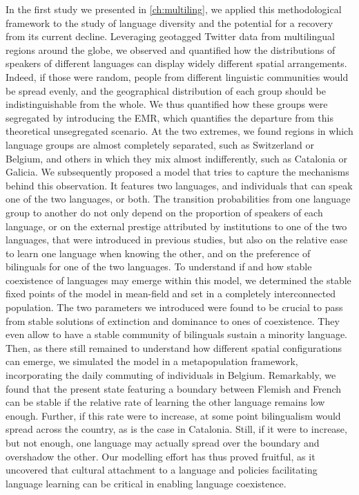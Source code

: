 \documentclass[../thesis.tex]{subfiles}
\begin{document}
In the first study we presented in \cref{ch:multiling}, we applied this methodological
framework to the study of language diversity and the potential for a recovery from its
current decline. Leveraging geotagged Twitter data from multilingual regions around the
globe, we observed and quantified how the distributions of speakers of different
languages can display widely different spatial arrangements. Indeed, if those were
random, people from different linguistic communities would be spread evenly, and the
geographical distribution of each group should be indistinguishable from the whole. We
thus quantified how these groups were segregated by introducing the \ac{EMR}, which
quantifies the departure from this theoretical unsegregated scenario. At the two
extremes, we found regions in which language groups are almost completely separated,
such as Switzerland or Belgium, and others in which they mix almost indifferently, such
as Catalonia or Galicia. We subsequently proposed a model that tries to capture the
mechanisms behind this observation. It features two languages, and individuals that can
speak one of the two languages, or both. The transition probabilities from one language
group to another do not only depend on the proportion of speakers of each language, or
on the external prestige attributed by institutions to one of the two languages, that
were introduced in previous studies, but also on the relative ease to learn one language
when knowing the other, and on the preference of bilinguals for one of the two
languages. To understand if and how stable coexistence of languages may emerge within
this model, we determined the stable fixed points of the model in mean-field and set in
a completely interconnected population. The two parameters we introduced were found to
be crucial to pass from stable solutions of extinction and dominance to ones of
coexistence. They even allow to have a stable community of bilinguals sustain a minority
language. Then, as there still remained to understand how different spatial
configurations can emerge, we simulated the model in a metapopulation framework,
incorporating the daily commuting of individuals in Belgium. Remarkably, we found that
the present state featuring a boundary between Flemish and French can be stable if the
relative rate of learning the other language remains low enough. Further, if this rate
were to increase, at some point bilingualism would spread across the country, as is the
case in Catalonia. Still, if it were to increase, but not enough, one language may
actually spread over the boundary and overshadow the other. Our modelling effort has
thus proved fruitful, as it uncovered that cultural attachment to a language and
policies facilitating language learning can be critical in enabling language
coexistence.
\end{document}
